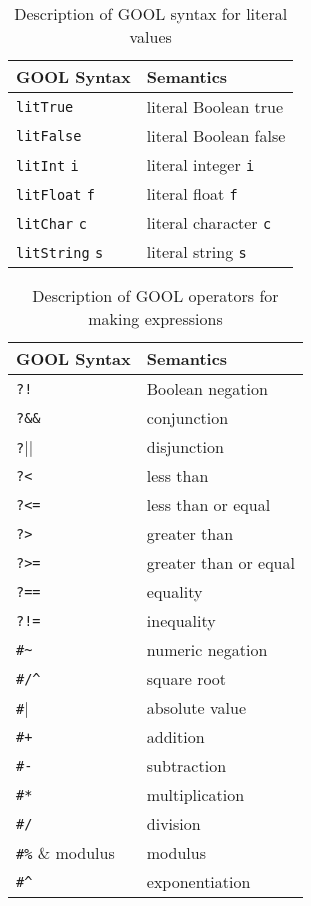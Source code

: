 \documentclass[sigplan,review,anonymous,prologue,dvipsnames]{acmart}
\begin{document}
\begin{table}[!h]
	\caption{Description of GOOL syntax for literal values}
	\begin{tabular}{p{} p{}}
		\textbf{GOOL Syntax} & \textbf{Semantics} \\
		\midrule
		\verb|litTrue| & literal Boolean true \\
		\verb|litFalse| & literal Boolean false \\
		\verb|litInt| \verb|i| & literal integer \verb|i| \\
		\verb|litFloat| \verb|f| & literal float \verb|f| \\
		\verb|litChar| \verb|c| & literal character \verb|c| \\
		\verb|litString| \verb|s| & literal string \verb|s| \\
	\end{tabular}
	\label{tab:literals}
\end{table}

\begin{table}[!h]
	\caption{Description of GOOL operators for making expressions}
	\begin{tabular}{p{} p{}}
		\textbf{GOOL Syntax} & \textbf{Semantics} \\
		\midrule
		\verb|?!| & Boolean negation \\
		\verb|?&&| & conjunction \\
		\verb|?||| & disjunction \\
		\verb|?<| & less than \\
		\verb|?<=| & less than or equal \\
		\verb|?>| & greater than \\
		\verb|?>=| & greater than or equal \\
		\verb|?==| & equality \\
		\verb|?!=| & inequality \\
		\verb|#~| & numeric negation \\
		\verb|#/^| & square root \\
		\verb|#|| & absolute value \\
		\verb|#+| & addition \\
		\verb|#-| & subtraction \\
		\verb|#*| & multiplication \\
		\verb|#/| & division \\
		\verb|#%| & modulus \\
		\verb|#^| & exponentiation \\
	\end{tabular}
	\label{tab:operators}
\end{table}
\end{document}
